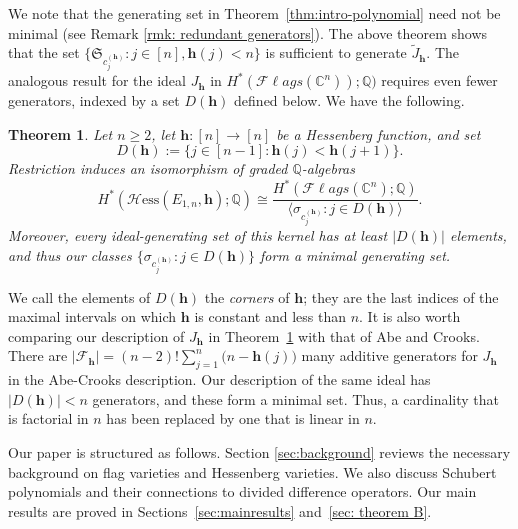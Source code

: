 \documentclass[11pt]{amsart}
\theoremstyle{plain}
\newtheorem{introtheorem}{Theorem}
\theoremstyle{definition}
\newcommand{\Hess}{\mathcal{H}\mathrm{ess}}
\newcommand{\hess}{{\mathbf h}}
\newcommand{\Fl}{\mathcal{F}\ell ags}
\newcommand{\Q}{\mathbb{ Q}}           %
\numberwithin{equation}{section}
\begin{document}
We note that the generating set in Theorem~\ref{thm:intro-polynomial} need not be minimal (see Remark
\ref{rmk: redundant generators}).
The above theorem shows that the set $\{\mathfrak{S}_{c_j^{(\hess)}}: j \in [n], \hess(j) <n\}$ is sufficient to generate $\tilde{J}_\hess$. The analogous result for the ideal $J_\hess$ in $H^*(\Fl(\mathbb{C}^n));\Q)$ requires even fewer generators, indexed by a set $D(\hess)$ defined below. We have the following. 

\begin{introtheorem}\label{thm:intro-cohomology}
Let $n\geq 2$, let $\hess:[n]\to[n]$ be a Hessenberg function, and set
\begin{equation}\label{eq: def D hess}
D(\hess):=\{j\in[n-1]:\hess(j)<\hess(j+1)\}.
\end{equation}
Restriction induces an isomorphism of graded $\mathbb{Q}$-algebras
\[
H^*(\Hess(E_{1,n},\hess);\mathbb{Q})
\cong
\frac{H^*(\Fl(\mathbb{C}^n);\mathbb{Q})}
{\bigl\langle \sigma_{c_j^{(\hess)}}:j\in D(\hess)\bigr\rangle}.
\]
Moreover, every
ideal-generating set of this kernel has at least $|D(\hess)|$ elements, and thus our classes $\{\sigma_{c_j^{(\hess)}}:j\in D(\hess)\}$ form a minimal
generating set. 

\end{introtheorem}

We call the elements of $D(\hess)$ the \emph{corners} of $\hess$; they are the last indices of the maximal intervals on which $\hess$ is constant and less than $n$. It is also worth comparing our description of $J_\hess$ in Theorem~\ref{thm:intro-cohomology} with that of Abe and Crooks. There are $\lvert \mathcal{F}_\hess \rvert = (n-2)!\sum_{j=1}^{n}\bigl(n-\hess(j)\bigr)$ many additive generators for $J_\hess$ in the Abe-Crooks description. Our description of the same ideal has $\lvert D(\hess)\rvert < n$ generators, and these form a minimal set. Thus, a cardinality that is factorial in $n$ has been replaced by one that is linear in $n$. 







Our paper is structured as follows.  Section \ref{sec:background}
reviews the necessary
background on flag varieties and Hessenberg varieties.  We also discuss
Schubert polynomials and their connections to divided difference operators.
Our main results are proved in Sections~\ref{sec:mainresults} and~\ref{sec: theorem B}.

\end{document}
